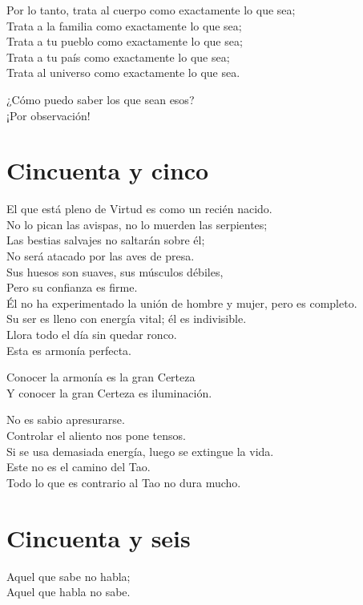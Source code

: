 \documentclass[hidelinks]{memoir}
\begin{document}
	Por lo tanto, trata al cuerpo como exactamente lo que sea;\\
	Trata a la familia como exactamente lo que sea;\\
	Trata a tu pueblo como exactamente lo que sea;\\
	Trata a tu país como exactamente lo que sea;\\
	Trata al universo como exactamente lo que sea.
	
	¿Cómo puedo saber los que sean esos?\\
	¡Por observación!
	
	\chapter*{Cincuenta y cinco}
	
	El que está pleno de Virtud es como un recién nacido.\\
	No lo pican las avispas, no lo muerden las serpientes;\\
	Las bestias salvajes no saltarán sobre él;\\
	No será atacado por las aves de presa.\\
	Sus huesos son suaves, sus músculos débiles,\\
	Pero su confianza es firme.\\
	Él no ha experimentado la unión de hombre y mujer, pero es completo.\\
	Su ser es lleno con energía vital; él es indivisible.\\
	Llora todo el día sin quedar ronco.\\
	Esta es armonía perfecta.
	
	Conocer la armonía es la gran Certeza\\
	Y conocer la gran Certeza es iluminación.
	
	No es sabio apresurarse.\\
	Controlar el aliento nos pone tensos.\\
	Si se usa demasiada energía, luego se extingue la vida.\\
	Este no es el camino del Tao.\\
	Todo lo que es contrario al Tao no dura mucho.
	
	\chapter*{Cincuenta y seis}
	
	Aquel que sabe no habla;\\
	Aquel que habla no sabe.
	
\end{document}
